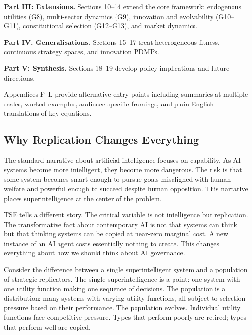\documentclass[12pt]{article}
\begin{document}
\textbf{Part III: Extensions.} Sections 10--14 extend the core framework: endogenous utilities (G8), multi-sector dynamics (G9), innovation and evolvability (G10--G11), constitutional selection (G12--G13), and market dynamics.

\textbf{Part IV: Generalisations.} Sections 15--17 treat heterogeneous fitness, continuous strategy spaces, and innovation PDMPs.

\textbf{Part V: Synthesis.} Sections 18--19 develop policy implications and future directions.

Appendices F--L provide alternative entry points including summaries at multiple scales, worked examples, audience-specific framings, and plain-English translations of key equations.


\subsection{Why Replication Changes Everything}
\label{sec:core-intuition}

The standard narrative about artificial intelligence focuses on capability. As AI systems become more intelligent, they become more dangerous. The risk is that some system becomes smart enough to pursue goals misaligned with human welfare and powerful enough to succeed despite human opposition. This narrative places superintelligence at the center of the problem.

TSE tells a different story. The critical variable is not intelligence but replication. The transformative fact about contemporary AI is not that systems can think but that thinking systems can be copied at near-zero marginal cost. A new instance of an AI agent costs essentially nothing to create. This changes everything about how we should think about AI governance.

Consider the difference between a single superintelligent system and a population of strategic replicators. The single superintelligence is a point: one system with one utility function making one sequence of decisions. The population is a distribution: many systems with varying utility functions, all subject to selection pressure based on their performance. The population evolves. Individual utility functions face competitive pressure. Types that perform poorly are retired; types that perform well are copied.
\end{document}
